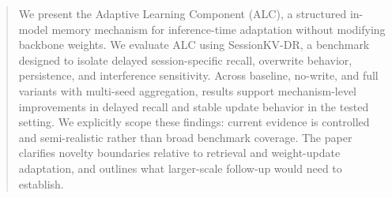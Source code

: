 \begin{abstract}
We present the Adaptive Learning Component (ALC), a structured in-model memory mechanism for inference-time adaptation without modifying backbone weights. We evaluate ALC using SessionKV-DR, a benchmark designed to isolate delayed session-specific recall, overwrite behavior, persistence, and interference sensitivity. Across baseline, no-write, and full variants with multi-seed aggregation, results support mechanism-level improvements in delayed recall and stable update behavior in the tested setting. We explicitly scope these findings: current evidence is controlled and semi-realistic rather than broad benchmark coverage. The paper clarifies novelty boundaries relative to retrieval and weight-update adaptation, and outlines what larger-scale follow-up would need to establish.
\end{abstract}
